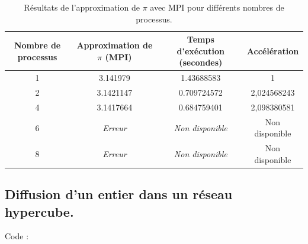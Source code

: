\documentclass[a4paper,13pt]{book}
\begin{document}
\begin{table}[h!]
    \centering
    \begin{tabular}{|c|c|c|c|}
    \hline
    \textbf{Nombre de processus} & \textbf{Approximation de $\pi$ (MPI)} & \textbf{Temps d'exécution (secondes)} & \textbf{Accélération}\\
    \hline
    1                           & 3.141979                              & 1.43688583   & 1                              \\\hline
    2                           & 3.1421147                              & 0.709724572     &    2,024568243                       \\\hline
    4                           & 3.1417664                              & 0.684759401      &     2,098380581                    \\\hline
    6                           & \textit{Erreur}                       & \textit{Non disponible}    & Non disponible            \\\hline
    8                           & \textit{Erreur}                       & \textit{Non disponible}    & Non disponible           \\\hline
    \end{tabular}
    \caption{Résultats de l'approximation de $\pi$ avec MPI pour différents nombres de processus.}
    \label{tab:pi_mpi_py}
    \end{table}

\subsection{Diffusion d'un entier dans un réseau hypercube.  }
Code :  \\
\end{document}
